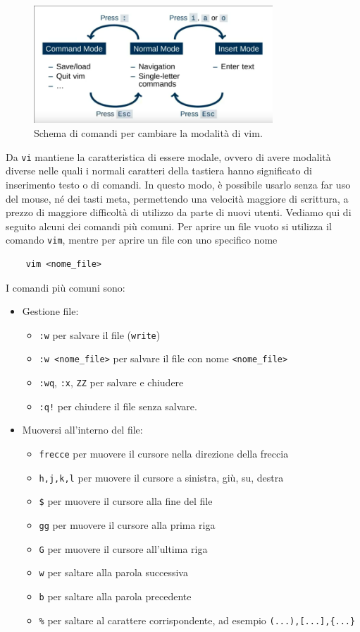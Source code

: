 \documentclass[11pt]{book}
\begin{document}
\begin{figure}
	\centering
	\includegraphics[width=0.8\textwidth]{img/vim_modes.png}
	\caption{Schema di comandi per cambiare la modalità di vim.}
	\label{vim_modes}
\end{figure}
Da \verb*|vi| mantiene la caratteristica di essere modale, ovvero di avere modalità diverse nelle quali i normali caratteri della tastiera hanno significato di inserimento testo o di comandi. In questo modo, è possibile usarlo senza far uso del mouse, né dei tasti meta, permettendo una velocità maggiore di scrittura, a prezzo di maggiore difficoltà di utilizzo da parte di nuovi utenti. Vediamo qui di seguito alcuni dei comandi più comuni. Per aprire un file vuoto si utilizza il comando \verb*|vim|, mentre per aprire un file con uno specifico nome
\begin{verbatim}
	vim <nome_file>
\end{verbatim}
 I comandi più comuni sono:
 \begin{itemize}
 	\item Gestione file:
 		\begin{itemize}
 			\item \verb*|:w| per salvare il file (\verb*|write|)
 			\item \verb*|:w <nome_file>| per salvare il file con nome \verb*|<nome_file>|
 			\item \verb*|:wq|, \verb*|:x|, \verb*|ZZ| per salvare e chiudere
 			\item \verb*|:q!| per chiudere il file senza salvare.
 		\end{itemize}
 	\item Muoversi all'interno del file:
 		\begin{itemize}
 			\item \verb*|frecce| per muovere il cursore nella direzione della freccia
 			\item \verb*|h,j,k,l| per muovere il cursore a sinistra, giù, su, destra
 			\item \verb*|$| per muovere il cursore alla fine del file
 			\item \verb*|gg| per muovere il cursore alla prima riga
 			\item \verb*|G| per muovere il cursore all'ultima riga
 			\item \verb*|w| per saltare alla parola successiva
 			\item \verb*|b| per saltare alla parola precedente
 			\item \verb*|%| per saltare al carattere corrispondente, ad esempio \verb*|(...),[...],{...}|
 		\end{itemize}
 \end{itemize}
\end{document}
